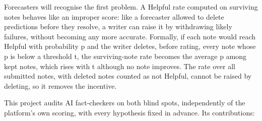 \documentclass[10.5pt]{article}
\begin{document}
Forecasters will recognise the first problem. A Helpful rate computed on surviving notes behaves like an improper score: like a forecaster allowed to delete predictions before they resolve, a writer can raise it by withdrawing likely failures, without becoming any more accurate. Formally, if each note would reach Helpful with probability p and the writer deletes, before rating, every note whose p is below a threshold t, the surviving-note rate becomes the average p among kept notes, which rises with t although no note improves. The rate over all submitted notes, with deleted notes counted as not Helpful, cannot be raised by deleting, so it removes the incentive.

This project audits AI fact-checkers on both blind spots, independently of the platform's own scoring, with every hypothesis fixed in advance. Its contributions:
\end{document}
